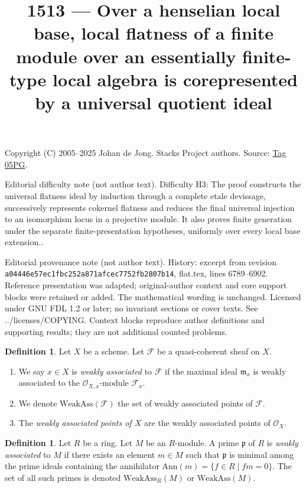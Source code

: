 \documentclass{amsart}
\theoremstyle{plain}
\theoremstyle{definition}
\newtheorem{definition}[subsection]{Definition}
\theoremstyle{remark}
\numberwithin{equation}{subsection}
\begin{document}
\title[Stacks Project, Tag 05PG]{1513 --- Over a henselian local base, local flatness of a finite module over an essentially finite-type local algebra is corepresented by a universal quotient ideal}
\maketitle
\noindent Copyright (C) 2005--2025 Johan de Jong. Stacks Project authors. Source: \href{https://stacks.math.columbia.edu/tag/05PG}{Tag 05PG}.

\noindent Editorial difficulty note (not author text). Difficulty H3: The proof constructs the universal flatness ideal by induction through a complete etale devissage, successively represents cokernel flatness and reduces the final universal injection to an isomorphism locus in a projective module. It also proves finite generation under the separate finite-presentation hypotheses, uniformly over every local base extension..

\noindent Editorial provenance note (not author text). History: excerpt from revision \texttt{a0444\allowbreak 6e57e\allowbreak c1fbc\allowbreak 252a8\allowbreak 71afc\allowbreak ec775\allowbreak 2fb28\allowbreak 07b14}, flat.tex, lines 6789--6902. Reference presentation was adapted; original-author context and core support blocks were retained or added. The mathematical wording is unchanged. Licensed under GNU FDL 1.2 or later; no invariant sections or cover texts. See ../licenses/COPYING. Context blocks reproduce author definitions and supporting results; they are not additional counted problems.

\begin{definition}
\label{divisors-definition-weakly-associated}
Let $X$ be a scheme.
Let $\mathcal{F}$ be a quasi-coherent sheaf on $X$.
\begin{enumerate}
\item We say $x \in X$ is {\it weakly associated} to $\mathcal{F}$
if the maximal ideal $\mathfrak m_x$ is weakly associated to the
$\mathcal{O}_{X, x}$-module $\mathcal{F}_x$.
\item We denote $\text{WeakAss}(\mathcal{F})$ the set of weakly associated
points of $\mathcal{F}$.
\item The {\it weakly associated points of $X$} are the weakly associated
points of $\mathcal{O}_X$.
\end{enumerate}
\end{definition}

\begin{definition}
\label{algebra-definition-weakly-associated}
Let $R$ be a ring. Let $M$ be an $R$-module.
A prime $\mathfrak p$ of $R$ is {\it weakly associated} to $M$
if there exists an element $m \in M$ such that $\mathfrak p$ is minimal
among the prime ideals containing the annihilator
$\text{Ann}(m) = \{f \in R \mid fm = 0\}$.
The set of all such primes is denoted $\text{WeakAss}_R(M)$
or $\text{WeakAss}(M)$.
\end{definition}
\end{document}
